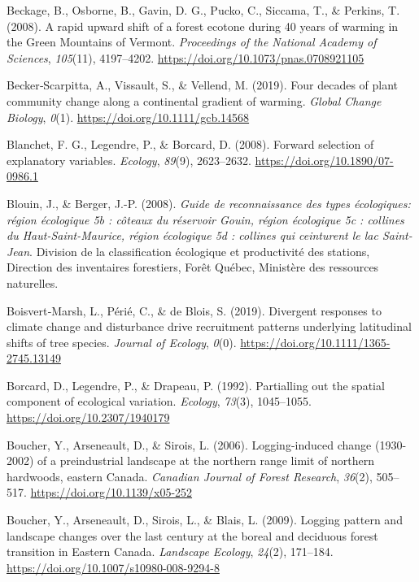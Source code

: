 \documentclass[
  a4paperpaper,
]{article}
\begin{document}
\leavevmode\hypertarget{ref-beckage_rapid_2008}{}%
Beckage, B., Osborne, B., Gavin, D. G., Pucko, C., Siccama, T., \&
Perkins, T. (2008). A rapid upward shift of a forest ecotone during 40
years of warming in the Green Mountains of Vermont. \emph{Proceedings of
the National Academy of Sciences}, \emph{105}(11), 4197--4202.
\url{https://doi.org/10.1073/pnas.0708921105}

\leavevmode\hypertarget{ref-beckerscarpitta_four_2019}{}%
Becker‐Scarpitta, A., Vissault, S., \& Vellend, M. (2019). Four decades
of plant community change along a continental gradient of warming.
\emph{Global Change Biology}, \emph{0}(1).
\url{https://doi.org/10.1111/gcb.14568}

\leavevmode\hypertarget{ref-blanchet_forward_2008}{}%
Blanchet, F. G., Legendre, P., \& Borcard, D. (2008). Forward selection
of explanatory variables. \emph{Ecology}, \emph{89}(9), 2623--2632.
\url{https://doi.org/10.1890/07-0986.1}

\leavevmode\hypertarget{ref-blouin_guide_2008}{}%
Blouin, J., \& Berger, J.-P. (2008). \emph{Guide de reconnaissance des
types écologiques: région écologique 5b : côteaux du réservoir Gouin,
région écologique 5c : collines du Haut-Saint-Maurice, région écologique
5d : collines qui ceinturent le lac Saint-Jean}. Division de la
classification écologique et productivité des stations, Direction des
inventaires forestiers, Forêt Québec, Ministère des ressources
naturelles.

\leavevmode\hypertarget{ref-boisvertmarsh_divergent_2019}{}%
Boisvert‐Marsh, L., Périé, C., \& de Blois, S. (2019). Divergent
responses to climate change and disturbance drive recruitment patterns
underlying latitudinal shifts of tree species. \emph{Journal of
Ecology}, \emph{0}(0). \url{https://doi.org/10.1111/1365-2745.13149}

\leavevmode\hypertarget{ref-borcard_partialling_1992}{}%
Borcard, D., Legendre, P., \& Drapeau, P. (1992). Partialling out the
spatial component of ecological variation. \emph{Ecology}, \emph{73}(3),
1045--1055. \url{https://doi.org/10.2307/1940179}

\leavevmode\hypertarget{ref-boucher_logging-induced_2006}{}%
Boucher, Y., Arseneault, D., \& Sirois, L. (2006). Logging-induced
change (1930-2002) of a preindustrial landscape at the northern range
limit of northern hardwoods, eastern Canada. \emph{Canadian Journal of
Forest Research}, \emph{36}(2), 505--517.
\url{https://doi.org/10.1139/x05-252}

\leavevmode\hypertarget{ref-boucher_logging_2009}{}%
Boucher, Y., Arseneault, D., Sirois, L., \& Blais, L. (2009). Logging
pattern and landscape changes over the last century at the boreal and
deciduous forest transition in Eastern Canada. \emph{Landscape Ecology},
\emph{24}(2), 171--184. \url{https://doi.org/10.1007/s10980-008-9294-8}
\end{document}

